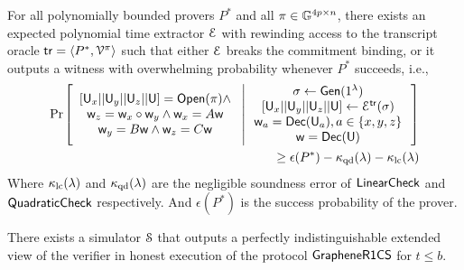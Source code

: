 \begin{lemma}[Soundness]\label{lem:graphene_sound}
	For all polynomially bounded provers $P^\ast$ and all $\pi\in\mathbb{G}^{4p\times n}$, there exists an expected polynomial time extractor $\mathcal{E}$ with rewinding access to the transcript oracle $\mathsf{tr} = \langle P^{\ast},\mathcal{V}^{\pi}\rangle$ such that either $\mathcal{E}$ breaks the commitment binding, or it outputs a witness with overwhelming probability whenever $P^\ast$ succeeds, i.e.,
	{\footnotesize
		\begin{align*}
		\condprob{
			\begin{array}{c}
			{[}\ewit_x||\ewit_y||\ewit_z||\ewit{]}=\open(\pi)\wedge \\
			\wit_z=\wit_x\circ\wit_y\wedge \wit_x=A\wit\\
			\wit_y=B\wit \wedge \wit_z=C\wit
			\end{array}
		}{
			\begin{array}{c}
			\sigma %
			\leftarrow \gen(\secparam) \\
			{[}\ewit_x||\ewit_y||\ewit_z||\ewit{]}%
			\leftarrow \extr^{\mathsf{tr}}(\sigma) \\ 
			\wit_a=\dec(\ewit_a), a\in \{x,y,z\}\\
			\wit=\dec(\ewit)
			\end{array}
		}\\
		\geq \epsilon(P^\ast) - \kappa_{\rm qd}(\secpar) -\kappa_{\rm lc}(\secpar)
		\end{align*}
	}
	Where $\kappa_{\rm lc}(\lambda)$ and $\kappa_{\rm qd}(\lambda)$ are the negligible soundness error of $\mathsf{LinearCheck}$ and $\mathsf{QuadraticCheck}$ respectively. And $\epsilon(P^\ast)$ is the success probability of the prover.
\end{lemma}

\begin{lemma}\label{lem:simgraphene}
	There exists a simulator $\mathcal{S}$ that outputs a perfectly indistinguishable extended view of the verifier in honest execution of the protocol $\mathsf{GrapheneR1CS}$ for $t\leq b$.
\end{lemma}
